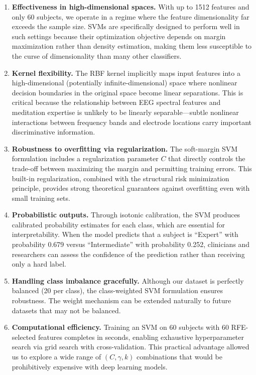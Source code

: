 \documentclass[12pt,a4paper]{article}
\begin{document}
\begin{enumerate}
  \item \textbf{Effectiveness in high-dimensional spaces.} With up to 1512 features and only 60 subjects, we operate in a regime where the feature dimensionality far exceeds the sample size. SVMs are specifically designed to perform well in such settings because their optimization objective depends on margin maximization rather than density estimation, making them less susceptible to the curse of dimensionality than many other classifiers.

  \item \textbf{Kernel flexibility.} The RBF kernel implicitly maps input features into a high-dimensional (potentially infinite-dimensional) space where nonlinear decision boundaries in the original space become linear separations. This is critical because the relationship between EEG spectral features and meditation expertise is unlikely to be linearly separable---subtle nonlinear interactions between frequency bands and electrode locations carry important discriminative information.

  \item \textbf{Robustness to overfitting via regularization.} The soft-margin SVM formulation includes a regularization parameter $C$ that directly controls the trade-off between maximizing the margin and permitting training errors. This built-in regularization, combined with the structural risk minimization principle, provides strong theoretical guarantees against overfitting even with small training sets.

  \item \textbf{Probabilistic outputs.} Through isotonic calibration, the SVM produces calibrated probability estimates for each class, which are essential for interpretability. When the model predicts that a subject is ``Expert'' with probability 0.679 versus ``Intermediate'' with probability 0.252, clinicians and researchers can assess the confidence of the prediction rather than receiving only a hard label.

  \item \textbf{Handling class imbalance gracefully.} Although our dataset is perfectly balanced (20 per class), the class-weighted SVM formulation ensures robustness. The weight mechanism can be extended naturally to future datasets that may not be balanced.

  \item \textbf{Computational efficiency.} Training an SVM on 60 subjects with 60 RFE-selected features completes in seconds, enabling exhaustive hyperparameter search via grid search with cross-validation. This practical advantage allowed us to explore a wide range of $(C, \gamma, k)$ combinations that would be prohibitively expensive with deep learning models.
\end{enumerate}
\end{document}

